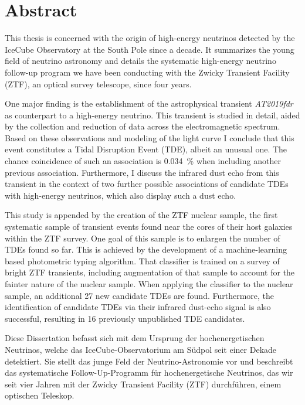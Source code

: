 \chapter*{Abstract}\label{abstract}


This thesis is concerned with the origin of high-energy neutrinos detected by the IceCube Observatory at the South Pole since a decade. It summarizes the young field of neutrino astronomy and details the systematic high-energy neutrino follow-up program we have been conducting with the Zwicky Transient Facility (ZTF), an optical survey telescope, since four years.

One major finding is the establishment of the astrophysical transient \textit{AT2019fdr} as counterpart to a high-energy neutrino. This transient is studied in detail, aided by the collection and reduction of data across the electromagnetic spectrum. Based on these observations and modeling of the light curve I conclude that this event constitutes a Tidal Disruption Event (TDE), albeit an unusual one. The chance coincidence of such an association is \SI{0.034}{\percent} when including another previous association. Furthermore, I discuss the infrared dust echo from this transient in the context of two further possible associations of candidate TDEs with high-energy neutrinos, which also display such a dust echo.

This study is appended by the creation of the ZTF nuclear sample, the first systematic sample of transient events found near the cores of their host galaxies within the ZTF survey. One goal of this sample is to enlargen the number of TDEs found so far. This is achieved by the development of a machine-learning based photometric typing algorithm. That classifier is trained on a survey of bright ZTF transients, including augmentation of that sample to account for the fainter nature of the nuclear sample. When applying the classifier to the nuclear sample, an additional 27 new candidate TDEs are found. Furthermore, the identification of candidate TDEs via their infrared dust-echo signal is also successful, resulting in 16 previously unpublished TDE candidates.

\newpage

Diese Dissertation befasst sich mit dem Ursprung der hochenergetischen Neutrinos, welche das IceCube-Observatorium am Südpol seit einer Dekade detektiert. Sie stellt das junge Feld der Neutrino-Astronomie vor und beschreibt das systematische Follow-Up-Programm für hochenergetische Neutrinos, das wir seit vier Jahren mit der Zwicky Transient Facility (ZTF) durchführen, einem optischen Teleskop.

